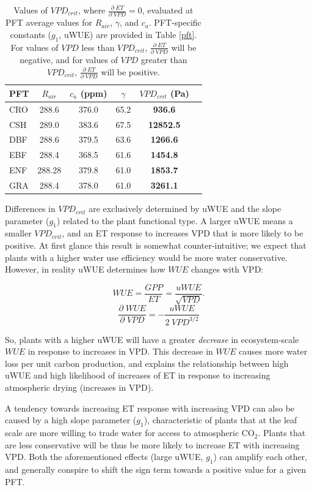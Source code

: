 \documentclass[draft,linenumbers]{agujournal}
\begin{document}
\begin{table}
\caption{Values of $VPD_{crit}$, where $\frac{\partial \; ET}{\partial
\; VPD} = 0$, evaluated at PFT average values for $R_{air}$, $\gamma$,
and $c_a$. PFT-specific constants ($g_1$, uWUE) are provided in Table
\ref{pft}. For values of $VPD$ less than $VPD_{crit}$, $\frac{\partial
\; ET}{\partial \; VPD}$ will be negative, and for values of $VPD$
greater than $VPD_{crit}$, $\frac{\partial \; ET}{\partial \; VPD}$
will be positive.}  \centering
\begin{tabular}{l c c c c c} \hline PFT & $R_{air}$ & $c_a$ (ppm) &
$\gamma$ & \textbf{$VPD_{crit}$ (Pa)} \\ \hline CRO & 288.6 & 376.0 &
65.2 & \textbf{936.6} \\ CSH & 289.0 & 383.6 & 67.5 & \textbf{12852.5}
\\ DBF & 288.6 & 379.5 & 63.6 & \textbf{1266.6} \\ EBF & 288.4 & 368.5
& 61.6 & \textbf{1454.8} \\ ENF & 288.28 & 379.8 & 61.0 &
\textbf{1853.7} \\ GRA & 288.4 & 378.0 & 61.0 & \textbf{3261.1} \\
\hline
\end{tabular}
\label{vpd_crit}
\end{table}


Differences in $VPD_{crit}$ are exclusively determined by uWUE and the
slope parameter ($g_1$) related to the plant functional type. A larger
uWUE means a smaller $VPD_{crit}$, and an ET response to increases VPD
that is more likely to be positive. At first glance this result is
somewhat counter-intuitive; we expect that plants with a higher water
use efficiency would be more water conservative. However, in reality
uWUE determines how $WUE$ changes with VPD:

\[WUE = \frac{GPP}{ET} = \frac{uWUE}{\sqrt{VPD}}.\]
\[\frac{\partial \; WUE}{\partial \; VPD} = -\frac{uWUE}{2 \;
VPD^{3/2}}\]

So, plants with a higher uWUE will have a greater \textit{decrease} in
ecosystem-scale $WUE$ in response to increases in VPD. This decrease
in $WUE$ causes more water loss per unit carbon production, and
explains the relationship between high uWUE and high likelihood of
increases of ET in response to increasing atmospheric drying
(increases in VPD).

A tendency towards increasing ET response with increasing VPD can also
be caused by a high slope parameter ($g_1$), characteristic of plants
that at the leaf scale are more willing to trade water for access to
atmospheric CO$_2$. Plants that are less conservative will be thus be
more likely to increase ET with increasing VPD. Both the
aforementioned effects (large uWUE, $g_1$) can amplify each other, and
generally conspire to shift the sign term towards a positive value for
a given PFT.
\end{document}
